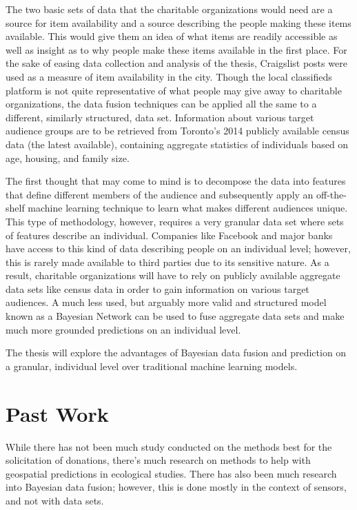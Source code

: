 \documentclass[12pt]{article}
\begin{document}
The two basic sets of data that the charitable organizations would need are a source for item availability and a source describing the people making these items available. This would give them an idea of what items are readily accessible as well as insight as to why people make these items available in the first place. For the sake of easing data collection and analysis of the thesis, Craigslist posts were used as a measure of item availability in the city. Though the local classifieds platform is not quite representative of what people may give away to charitable organizations, the data fusion techniques can be applied all the same to a different, similarly structured, data set. Information about various target audience groups are to be retrieved from Toronto's 2014 publicly available census data (the latest available), containing aggregate statistics of individuals based on age, housing, and family size. 

The first thought that may come to mind is to decompose the data into features that define different members of the audience and subsequently apply an off-the-shelf machine learning technique to learn what makes different audiences unique. This type of methodology, however, requires a very granular data set where sets of features describe an individual. Companies like Facebook and major banks have access to this kind of data describing people on an individual level; however, this is rarely made available to third parties due to its sensitive nature. As a result, charitable organizations will have to rely on publicly available aggregate data sets like census data in order to gain information on various target audiences. A much less used, but arguably more valid and structured model known as a Bayesian Network can be used to fuse aggregate data sets and make much more grounded predictions on an individual level.

The thesis will explore the advantages of Bayesian data fusion and prediction on a granular, individual level over traditional machine learning models. 

\newpage
\section{Past Work} %
While there has not been much study conducted on the methods best for the solicitation of donations, there's much research on methods to help with geospatial predictions in ecological studies. There has also been much research into Bayesian data fusion; however, this is done mostly in the context of sensors, and not with data sets. 
\end{document}

